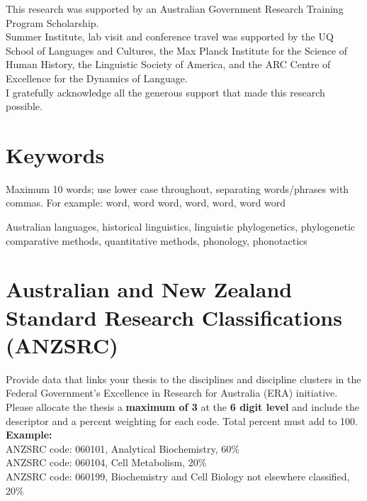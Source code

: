 
This research was supported by an Australian Government Research Training Program Scholarship.\\

\noindent
Summer Institute, lab visit and conference travel was supported by the UQ School of Languages and Cultures, the Max Planck Institute for the Science of Human History, the Linguistic Society of America, and the ARC Centre of Excellence for the Dynamics of Language.\\

\noindent
I gratefully acknowledge all the generous support that made this research possible.



\section*{Keywords}

\begin{instructional}
	Maximum 10 words; use lower case throughout, separating words/phrases with commas. For example: word, word word, word, word, word word
\end{instructional}

Australian languages, historical linguistics, linguistic phylogenetics, phylogenetic comparative methods, quantitative methods, phonology, phonotactics



\section*{Australian and New Zealand Standard Research Classifications (ANZSRC)}

\begin{instructional}
    Provide data that links your thesis to the disciplines and discipline clusters in the Federal Government’s Excellence in Research for Australia (ERA) initiative.\\
    
    \noindent
    Please allocate the thesis a \textbf{maximum of 3} \href{http://www.abs.gov.au/Ausstats/abs@.nsf/Latestproducts/6BB427AB9696C225CA2574180004463E?opendocument}{\color{blue}{Australian and New Zealand Standard Research Classifications (ANZSRC) codes}} at the \textbf{6 digit level} and include the descriptor and a percent weighting for each code. Total percent must add to 100.\\


\textbf{Example:}\\


    ANZSRC code: 060101, Analytical Biochemistry, 60\% \\
    \indent ANZSRC code: 060104, Cell Metabolism, 20\% \\
    \indent ANZSRC code: 060199, Biochemistry and Cell Biology not elsewhere classified, 20\%
\end{instructional}

